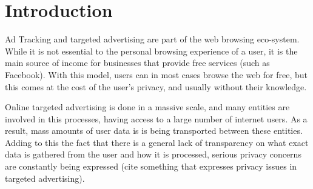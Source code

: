 \documentclass{l4proj}
\begin{document}
%
%
%
%
%
%
%
%
\chapter{Introduction}


Ad Tracking and targeted advertising are part of the web browsing eco-system. While it is not essential to the personal browsing experience of a user, it is the main source of income for businesses that provide free services (such as Facebook). With this model, users can in most cases browse the web for free, but this comes at the cost of the user's privacy, and usually without their knowledge. 

Online targeted advertising is done in a massive scale, and many entities are involved in this processes, having access to a large number of internet users. As a result, mass amounts of user data is is being transported between these entities. Adding to this the fact that there is a general lack of transparency on what exact data is gathered from the user and how it is processed, serious privacy concerns are constantly being expressed (cite something that expresses privacy issues in targeted advertising).
\end{document}
